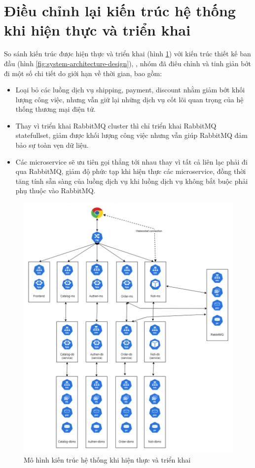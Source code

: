 \section{Điều chỉnh lại kiến trúc hệ thống khi hiện thực và triển khai}
\noindent So sánh kiến trúc được hiện thực và triển khai (hình \ref{fig:architecture-deploy}) với kiến trúc thiết kế ban đầu (hình \ref{fig:system-architecture-design}), , nhóm đã điêu chỉnh và tinh giản bớt đi một số chi tiết do giới hạn về thời gian, bao gồm:
\begin{itemize}
    \item Loại bỏ các luồng dịch vụ shipping, payment, discount nhằm giảm bớt khối lượng công việc, nhưng vẫn giữ lại những dịch vụ cốt lõi quan trọng của hệ thống thương mại điện tử.
    \item Thay vì triển khai RabbitMQ cluster thì chỉ triển khai RabbitMQ statefullset, giảm được khối lượng công việc nhưng vẫn giúp RabbitMQ đảm bảo sự toàn vẹn dữ liệu.
    \item Các microservice sẽ ưu tiên gọi thẳng tới nhau thay vì tất cả liên lạc phải đi qua RabbitMQ, giảm độ phức tạp khi hiện thực các microservice, đồng thời tăng tính sẵn sàng của luồng dịch vụ khi luồng dịch vụ không bắt buộc phải phụ thuộc vào RabbitMQ.
\end{itemize}
\begin{figure}[H]
    \begin{center}
        \includegraphics[scale = 0.5]{images/hanh/DATN_architecture}
    \end{center}
    \caption{Mô hình kiến trúc hệ thống khi hiện thực và triển khai}
    \label{fig:architecture-deploy}
  
\end{figure}
